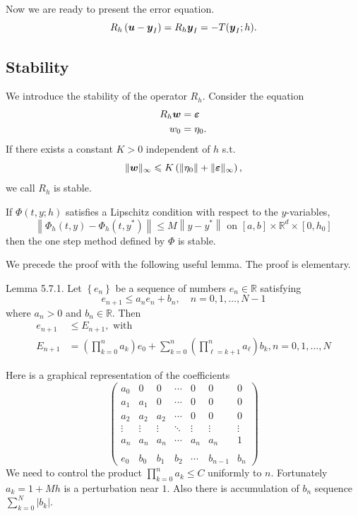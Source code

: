 \documentclass[10pt]{amsart}
\begin{document}
Now we are ready to present the error equation.
\begin{equation}\label{eq:error}
R_h\left(\boldsymbol u - \boldsymbol y_I\right)=R_h \boldsymbol y_I = - T(\boldsymbol y_I ; h).
\end{equation}

\subsection{Stability}
We introduce the stability of the operator $R_h$. Consider the equation
$$
\begin{aligned}
R_h \boldsymbol w &=\boldsymbol \varepsilon 
\\ w_0&=\eta_0.
\end{aligned}
$$
If there exists a constant $K>0$ independent of $h$ s.t. 
$$
\|\boldsymbol w\|_{\infty} \leqslant K\left(\left\|\eta_0\right\|+\|\boldsymbol \varepsilon\|_{\infty}\right),
$$
we call $R_h$ is stable. 

\begin{theorem}
If ${\Phi}(t, y ; h)$ satisfies a Lipschitz condition with respect to the $y$-variables,
$$
\left\|{\Phi}_h(t, y)-{\Phi}_h\left(t, y^*\right)\right\| \leq M\left\|y-y^*\right\| \text { on }[a, b] \times \mathbb{R}^d \times\left[0, h_0\right]
$$
then the one step method defined by $\Phi$ is stable.
\end{theorem}

We precede the proof with the following useful lemma. The proof is elementary.
\begin{lemma}
Lemma 5.7.1. Let $\left\{e_n\right\}$ be a sequence of numbers $e_n \in \mathbb{R}$ satisfying
$$
e_{n+1} \leq a_n e_n+b_n, \quad n=0,1, \ldots, N-1
$$
where $a_n>0$ and $b_n \in \mathbb{R}$. Then
$$
\begin{aligned}
e_{n+1} &\leq E_{n+1}, \text{ with }\\
E_{n+1}&=\left(\prod_{k=0}^{n} a_k\right) e_0+\sum_{k=0}^{n}\left(\prod_{\ell=k+1}^{n} a_{\ell}\right) b_k, n=0,1, \ldots, N
\end{aligned}
$$
\end{lemma}
Here is a graphical representation of the coefficients
$$
\begin{pmatrix}
a_0 & 0 & 0 & \cdots & 0 & 0 & 0\\
a_1 & a_1 & 0 & \cdots & 0 & 0 & 0\\
a_2 & a_2 & a_2 & \cdots & 0 & 0 & 0\\
\vdots & \vdots & \vdots & \ddots & \vdots & \vdots & \vdots \\
a_n & a_n & a_n & \cdots & a_n & a_n & 1 \\
\\
e_0 & b_0 & b_1 & b_2 & \cdots & b_{n-1} & b_n
\end{pmatrix}
$$
We need to control the product $\prod_{k=0}^{n} a_k \leq C$ uniformly to $n$. Fortunately $a_k  = 1 + Mh$ is a perturbation near $1$. Also there is accumulation of $b_n$ sequence $\sum_{k=0}^N |b_k|$. 
\end{document}
